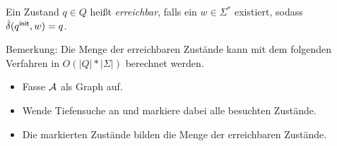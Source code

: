 \begin{Def}
  Ein Zustand $q \in Q$ heißt \emph{erreichbar}, falls ein $w \in \Sigma^*$ existiert, sodass $\hat \delta(q^\mathsf{init}, w) = q$.
\end{Def}
Bemerkung: Die Menge der erreichbaren Zustände kann mit dem folgenden Verfahren in $O(|Q|*|\Sigma|)$ berechnet werden.
  \begin{itemize}
  \item Fasse $\mathcal{A}$ als Graph auf.
  \item Wende Tiefensuche an und markiere dabei alle besuchten Zustände.
  \item Die markierten Zustände bilden die Menge der erreichbaren Zustände.
  \end{itemize}




